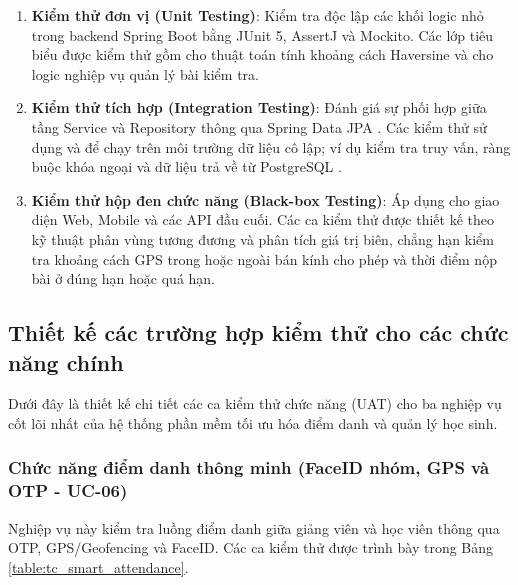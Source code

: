 \documentclass[../DoAn.tex]{subfiles}
\begin{document}
\begin{enumerate}
    \item \textbf{Kiểm thử đơn vị (Unit Testing)}:
    Kiểm tra độc lập các khối logic nhỏ trong backend Spring Boot \cite{spring_boot_docs2026} bằng JUnit 5, AssertJ và Mockito. Các lớp tiêu biểu được kiểm thử gồm  cho thuật toán tính khoảng cách Haversine \cite{sinnott1984virtues} và  cho logic nghiệp vụ quản lý bài kiểm tra.
    
    \item \textbf{Kiểm thử tích hợp (Integration Testing)}:
    Đánh giá sự phối hợp giữa tầng Service và Repository thông qua Spring Data JPA \cite{spring_data_jpa_docs2026}. Các kiểm thử sử dụng  và  để chạy trên môi trường dữ liệu cô lập; ví dụ  kiểm tra truy vấn, ràng buộc khóa ngoại và dữ liệu trả về từ PostgreSQL \cite{postgresql_docs2026}.
    
    \item \textbf{Kiểm thử hộp đen chức năng (Black-box Testing)}:
    Áp dụng cho giao diện Web, Mobile và các API đầu cuối. Các ca kiểm thử được thiết kế theo kỹ thuật phân vùng tương đương và phân tích giá trị biên, chẳng hạn kiểm tra khoảng cách GPS trong hoặc ngoài bán kính cho phép và thời điểm nộp bài ở đúng hạn hoặc quá hạn.
\end{enumerate}

\subsection{Thiết kế các trường hợp kiểm thử cho các chức năng chính}
\label{subsection:4.4.2}

Dưới đây là thiết kế chi tiết các ca kiểm thử chức năng (UAT) cho ba nghiệp vụ cốt lõi nhất của hệ thống phần mềm tối ưu hóa điểm danh và quản lý học sinh.

\subsubsection{Chức năng điểm danh thông minh (FaceID nhóm, GPS và OTP - UC-06)}

Nghiệp vụ này kiểm tra luồng điểm danh giữa giảng viên và học viên thông qua OTP, GPS/Geofencing và FaceID. Các ca kiểm thử được trình bày trong Bảng \ref{table:tc_smart_attendance}.
\end{document}
